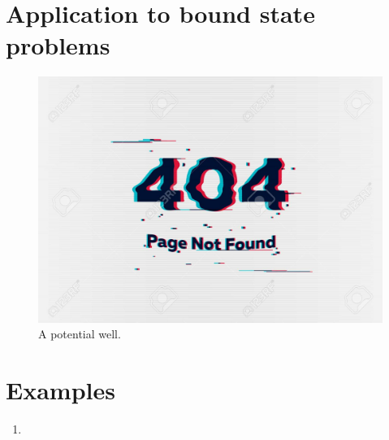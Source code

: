 \section{Application to bound state problems}
\begin{figure}
	\centering
	\includegraphics[width=0.5\linewidth]{Pictures/not-found.jpg}
	\caption{A potential well.}
	\label{chapter22.fig4}
\end{figure}





\section{Examples}
\begin{enumerate}
	\item 
	
\end{enumerate}

